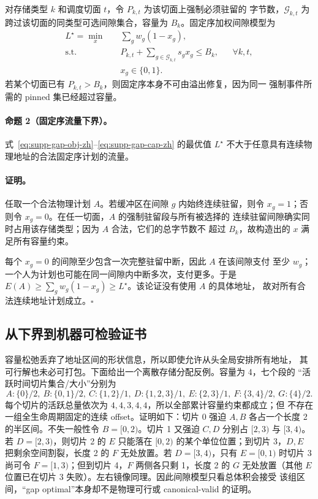 对存储类型 $k$ 和调度切面 $t$，令 $P_{k,t}$ 为该切面上强制必须驻留的
字节数，$\mathcal G_{k,t}$ 为跨过该切面的同类型可选间隙集合，容量为
$B_k$。固定序加权间隙模型为
\begin{align}
 L^\star=\min_x\quad &\sum_g w_g(1-x_g),\label{eq:supp-gap-obj-zh}\\
 \text{s.t.}\quad &P_{k,t}+\sum_{g\in\mathcal G_{k,t}}s_gx_g\le B_k,
 &&\forall k,t,\label{eq:supp-gap-cap-zh}\\
 &x_g\in\{0,1\}.\nonumber
\end{align}
若某个切面已有 $P_{k,t}>B_k$，则固定序本身不可由溢出修复，因为同一
强制事件所需的 pinned 集已经超过容量。

\paragraph{命题 2（固定序流量下界）。}
式~\eqref{eq:supp-gap-obj-zh}--\eqref{eq:supp-gap-cap-zh} 的最优值
$L^\star$ 不大于任意具有连续物理地址的合法固定序计划的流量。

\paragraph{证明。}
任取一个合法物理计划 $A$。若缓冲区在间隙 $g$ 内始终连续驻留，则令
$x_g=1$；否则令 $x_g=0$。在任一切面，$A$ 的强制驻留段与所有被选择的
连续驻留间隙确实同时占用该存储类型；因为 $A$ 合法，它们的总字节数不
超过 $B_k$，故构造出的 $x$ 满足所有容量约束。

每个 $x_g=0$ 的间隙至少包含一次完整驻留中断，因此 $A$ 在该间隙支付
至少 $w_g$；一个人为计划也可能在同一间隙内中断多次，支付更多。于是
$E(A)\ge\sum_gw_g(1-x_g)\ge L^\star$。该论证没有使用 $A$ 的具体地址，
故对所有合法连续地址计划成立。\hfill$\square$

\subsection{从下界到机器可检验证书}

容量松弛丢弃了地址区间的形状信息，所以即使允许从头全局安排所有地址，
其可行解也未必可打包。下面给出一个离散存储分配反例。容量为 4，七个段的
“活跃时间切片集合/大小”分别为
\[
 A:\{0\}/2,\ B:\{0,1\}/2,\ C:\{1,2\}/1,\
 D:\{1,2,3\}/1,\ E:\{2,3\}/1,\
 F:\{3,4\}/2,\ G:\{4\}/2.
\]
每个切片的活跃总量依次为 $4,4,3,4,4$，所以全部累计容量约束都成立；但
不存在一组全生命周期固定的连续 offset。证明如下：切片 0 强迫 $A,B$
各占一个长度 2 的半区间。不失一般性令 $B=[0,2)$。切片 1 又强迫 $C,D$
分别占 $[2,3)$ 与 $[3,4)$。若 $D=[2,3)$，则切片 2 的 $E$ 只能落在
$[0,2)$ 的某个单位位置；到切片 3，$D,E$ 把剩余空间割裂，长度 2 的 $F$
无处放置。若 $D=[3,4)$，只有 $E=[0,1)$ 时切片 3 尚可令
$F=[1,3)$；但到切片 4，$F$ 两侧各只剩 1，长度 2 的 $G$ 无处放置（其他
$E$ 位置已在切片 3 失败）。左右镜像同理。因此间隙模型只看总体积会接受
该组区间，“gap optimal”本身却不是物理可行或 canonical-valid 的证明。

